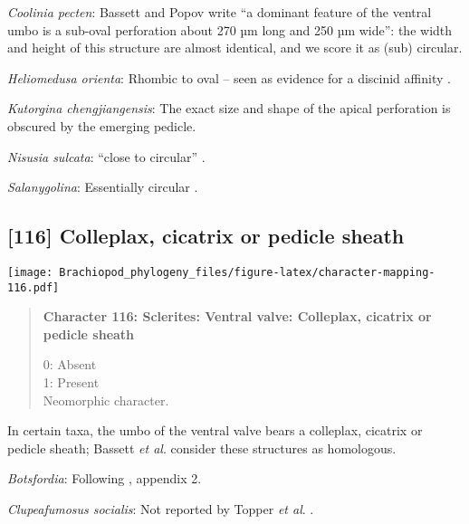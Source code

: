 \documentclass[openany]{book}
\theoremstyle{definition}
\theoremstyle{definition}
\theoremstyle{definition}
\theoremstyle{remark}
\begin{document}
\hypertarget{Coolinia_pecten-coding-115}{}
\emph{Coolinia pecten}: Bassett and Popov write ``a dominant feature of
the ventral umbo is a sub-oval perforation about 270 µm long and 250 µm
wide'': the width and height of this structure are almost identical, and
we score it as (sub) circular.

\hypertarget{Heliomedusa_orienta-coding-115}{}
\emph{Heliomedusa orienta}: Rhombic to oval -- seen as evidence for a
discinid affinity \citep{Chen2007Reinterpretationof}.

\hypertarget{Kutorgina_chengjiangensis-coding-115}{}
\emph{Kutorgina chengjiangensis}: The exact size and shape of the apical
perforation is obscured by the emerging pedicle.

\hypertarget{Nisusia_sulcata-coding-115}{}
\emph{Nisusia sulcata}: ``close to circular''
\citep{Holmer2018Evolutionarysignificance}.

\hypertarget{Salanygolina-coding-115}{}
\emph{Salanygolina}: Essentially circular \citep[fig.
4]{Holmer2009Theenigmatic}.

\subsection*{{[}116{]} Colleplax, cicatrix or pedicle
sheath}\label{colleplax-cicatrix-or-pedicle-sheath}

\texttt{[image: Brachiopod\_phylogeny\_files/figure-latex/character-mapping-116.pdf]}

\begin{quote}
\textbf{Character 116: Sclerites: Ventral valve: Colleplax, cicatrix or
pedicle sheath}

0: Absent\\
1: Present\\
Neomorphic character.
\end{quote}

In certain taxa, the umbo of the ventral valve bears a colleplax,
cicatrix or pedicle sheath; Bassett \emph{et al}.
\citeyearpar{Bassett2008Earlyontogeny} consider these structures as
homologous.

\hypertarget{Botsfordia-coding-116}{}
\emph{Botsfordia}: Following \citet{Williams1998Thediversity}, appendix
2.

\hypertarget{Clupeafumosus_socialis-coding-116}{}
\emph{Clupeafumosus socialis}: Not reported by Topper \emph{et al}.
\citeyearpar{Topper2013Reappraisalof}.
\end{document}
